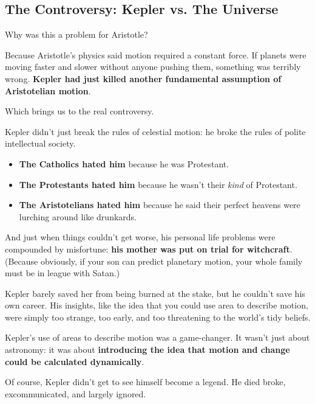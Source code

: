 \subsection{The Controversy: Kepler vs. The Universe}

Why was this a problem for Aristotle?

Because Aristotle’s physics said motion required a constant force. If planets were moving faster and slower without anyone pushing them, something was terribly wrong. \textbf{Kepler had just killed another fundamental assumption of Aristotelian motion}.

Which brings us to the real controversy.

Kepler didn’t just break the rules of celestial motion: he broke the rules of polite intellectual society.

\begin{itemize} 
	\item \textbf{The Catholics hated him} because he was Protestant. 
	\item \textbf{The Protestants hated him} because he wasn’t their \textit{kind} of Protestant. 
	\item \textbf{The Aristotelians hated him} because he said their perfect heavens were lurching around like drunkards. 
\end{itemize}

And just when things couldn’t get worse, his personal life problems were compounded by misfortune: \textbf{his mother was put on trial for witchcraft}. (Because obviously, if your son can predict planetary motion, your whole family must be in league with Satan.)

Kepler barely saved her from being burned at the stake, but he couldn’t save his own career. His insights, like the idea that you could use area to describe motion, were simply too strange, too early, and too threatening to the world’s tidy beliefs.

Kepler’s use of areas to describe motion was a game-changer. It wasn’t just about astronomy: it was about \textbf{introducing the idea that motion and change could be calculated dynamically}.

Of course, Kepler didn’t get to see himself become a legend. He died broke, excommunicated, and largely ignored. 


